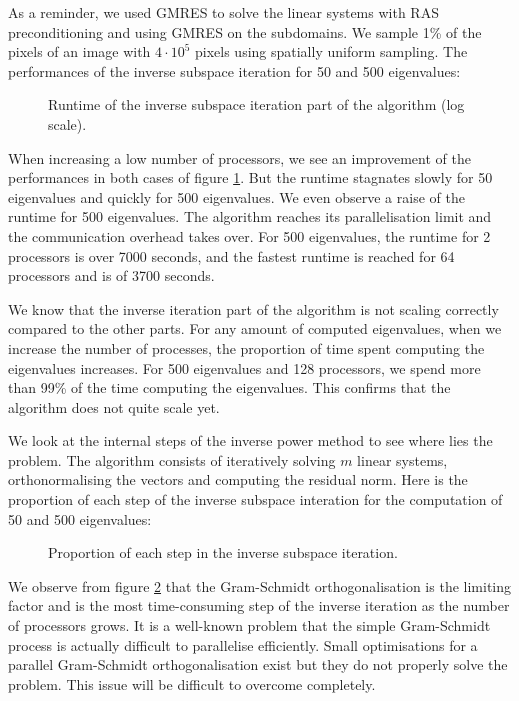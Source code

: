 As a reminder, we used GMRES to solve the linear systems with RAS preconditioning and using GMRES on the subdomains.
We sample 1\% of the pixels of an image with \(4 \cdot 10^5\) pixels using spatially uniform sampling.
The performances of the inverse subspace iteration for 50 and 500 eigenvalues:

\begin{figure}[H]
 \centering
 
 \caption{Runtime of the inverse subspace iteration part of the algorithm (log scale).}
 \label{fig:inv_it_runtime}
\end{figure}

When increasing a low number of processors, we see an improvement of the performances in both cases of figure \ref{fig:inv_it_runtime}.
But the runtime stagnates slowly for 50 eigenvalues and quickly for 500 eigenvalues.
We even observe a raise of the runtime for 500 eigenvalues.
The algorithm reaches its parallelisation limit and the communication overhead takes over.
For 500 eigenvalues, the runtime for 2 processors is over 7000 seconds, and the fastest runtime is reached for 64 processors and is of 3700 seconds.

We know that the inverse iteration part of the algorithm is not scaling correctly compared to the other parts.
For any amount of computed eigenvalues, when we increase the number of processes, the proportion of time spent computing the eigenvalues increases.
For 500 eigenvalues and 128 processors, we spend more than 99\% of the time computing the eigenvalues.
This confirms that the algorithm does not quite scale yet.

We look at the internal steps of the inverse power method to see where lies the problem.
The algorithm consists of iteratively solving \(m\) linear systems, orthonormalising the vectors and computing the residual norm.
Here is the proportion of each step of the inverse subspace interation for the computation of 50 and 500 eigenvalues:

\begin{figure}[H]
 \centering
 
 \caption{Proportion of each step in the inverse subspace iteration.}
 \label{fig:inv_it_proportion}
\end{figure}

We observe from figure \ref{fig:inv_it_proportion} that the Gram-Schmidt orthogonalisation is the limiting factor and is the most time-consuming step of the inverse iteration as the number of processors grows.
It is a well-known problem that the simple Gram-Schmidt process is actually difficult to parallelise efficiently.
Small optimisations for a parallel Gram-Schmidt orthogonalisation exist \cite{katagiri_parallel_gram_schmidt_2003} but they do not properly solve the problem.
This issue will be difficult to overcome completely.
